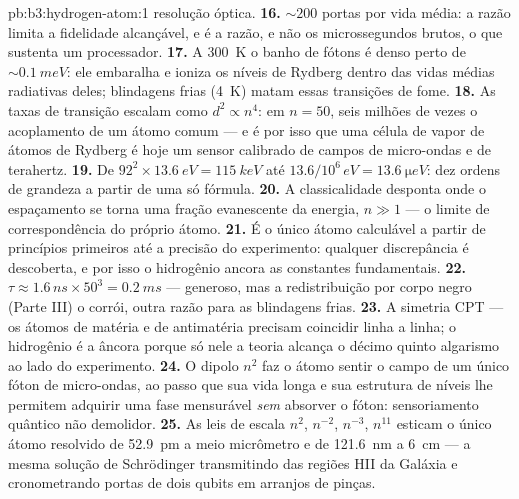 \begin{solution}{pb:b3:hydrogen-atom:1}
resolução óptica.
\textbf{16.} $\sim 200$ portas por vida média: a razão limita a
fidelidade alcançável, e é a razão, e não os microssegundos brutos, o
que sustenta um processador.
\textbf{17.} A \qty{300}{K} o banho de fótons é denso perto de
$\sim\qty{0.1}{meV}$: ele embaralha e ioniza os níveis de Rydberg
dentro das vidas médias radiativas deles; blindagens frias
(\qty{4}{K}) matam essas transições de fome.
\textbf{18.} As taxas de transição escalam como $d^2 \propto n^4$: em $n =
50$, seis milhões de vezes o acoplamento de um átomo comum --- e é
por isso que uma célula de vapor de átomos de Rydberg é hoje um sensor
calibrado de campos de micro-ondas e de terahertz.
\textbf{19.} De $92^2 \times \qty{13.6}{eV} = \qty{115}{keV}$ até
$13.6/10^6\,\unit{eV} = \qty{13.6}{\micro eV}$: dez ordens de grandeza
a partir de uma só fórmula.
\textbf{20.} A classicalidade desponta onde o espaçamento se torna uma
fração evanescente da energia, $n \gg 1$ --- o limite de
correspondência do próprio átomo.
\textbf{21.} É o único átomo calculável a partir de princípios
primeiros até a precisão do experimento: qualquer discrepância é
descoberta, e por isso o hidrogênio ancora as constantes fundamentais.
\textbf{22.} $\tau \approx 1.6\,\unit{ns} \times 50^3 =
\qty{0.2}{ms}$ --- generoso, mas a redistribuição por corpo negro
(Parte III) o corrói, outra razão para as blindagens frias.
\textbf{23.} A simetria CPT --- os átomos de matéria e de antimatéria
precisam coincidir linha a linha; o hidrogênio é a âncora porque só
nele a teoria alcança o décimo quinto algarismo ao lado do
experimento.
\textbf{24.} O dipolo $n^2$ faz o átomo sentir o campo de um único
fóton de micro-ondas, ao passo que sua vida longa e sua estrutura de
níveis lhe permitem adquirir uma fase mensurável \emph{sem} absorver o
fóton: sensoriamento quântico não demolidor.
\textbf{25.} As leis de escala $n^2$, $n^{-2}$, $n^{-3}$, $n^{11}$
esticam o único átomo resolvido de \qty{52.9}{pm} a meio micrômetro e
de \qty{121.6}{nm} a \qty{6}{cm} --- a mesma solução de Schrödinger
transmitindo das regiões HII da Galáxia e cronometrando portas de dois
qubits em arranjos de pinças.
\end{solution}
